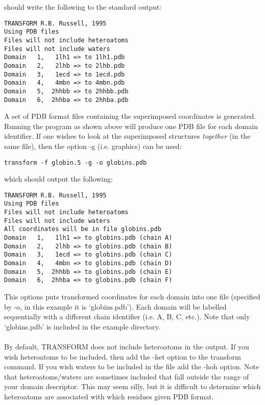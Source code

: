 should write the following to the standard output:\\

\begin{scriptsize}\begin{verbatim}
TRANSFORM R.B. Russell, 1995
Using PDB files
Files will not include heteroatoms
Files will not include waters
Domain   1,   1lh1 => to 1lh1.pdb
Domain   2,   2lhb => to 2lhb.pdb
Domain   3,   1ecd => to 1ecd.pdb
Domain   4,   4mbn => to 4mbn.pdb
Domain   5,  2hhbb => to 2hhbb.pdb
Domain   6,  2hhba => to 2hhba.pdb
\end{verbatim} \end{scriptsize}

A set of PDB format files containing the superimposed
coordinates is generated.  Running the program as shown above will produce one PDB 
file for each domain identifier.  If one wishes to look at the 
superimposed structures {\em together} (in the same file), then the 
option -g (i.e. graphics) can be used:\\

\begin{scriptsize}\begin{verbatim}
transform -f globin.5 -g -o globins.pdb
\end{verbatim} \end{scriptsize}

which should output the following:\\

\begin{scriptsize}\begin{verbatim}
TRANSFORM R.B. Russell, 1995
Using PDB files
Files will not include heteroatoms
Files will not include waters
All coordinates will be in file globins.pdb
Domain   1,   1lh1 => to globins.pdb (chain A)
Domain   2,   2lhb => to globins.pdb (chain B)
Domain   3,   1ecd => to globins.pdb (chain C)
Domain   4,   4mbn => to globins.pdb (chain D)
Domain   5,  2hhbb => to globins.pdb (chain E)
Domain   6,  2hhba => to globins.pdb (chain F)
\end{verbatim} \end{scriptsize}

This options puts transformed coordinates for each domain into one file
(specified by -o, in this example it is `globins.pdb').  Each domain will 
be labelled sequentially with a different chain identifier (i.e. A, B, C,
etc.).  Note that only `globins.pdb' is included in the example directory.\\
\\
By default, TRANSFORM does not include heteroatoms in the output.  If you 
wish heteroatoms to be included, then add the -het option to the transform command.  
If you wish waters to be included in the file add the -hoh option.
Note that heteroatoms/waters are sometimes included that fall outside the
range of your domain descriptor.  This may seem silly, but it
is difficult to determine which heteroatoms are associated with which residues
given PDB format.

